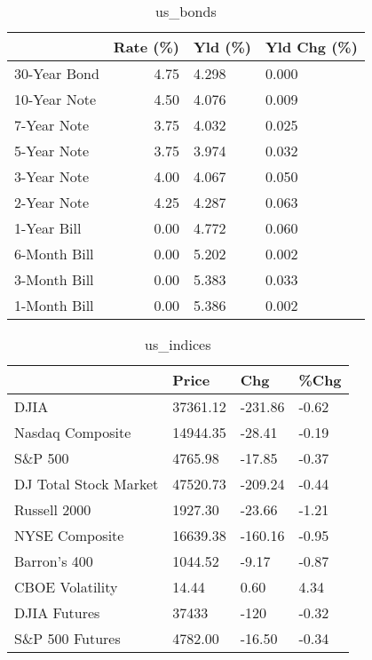 \documentclass{article}%
\begin{document}
%


\begin{table}[htbp]%
\caption{us\_bonds}%
\centering%
\begin{adjustbox}{width=1\textwidth}%
\begin{tabular}{lrll}
\toprule
             &  Rate (\%) & Yld (\%) & Yld Chg (\%) \\
\midrule
30-Year Bond &      4.75 &   4.298 &       0.000 \\
10-Year Note &      4.50 &   4.076 &       0.009 \\
 7-Year Note &      3.75 &   4.032 &       0.025 \\
 5-Year Note &      3.75 &   3.974 &       0.032 \\
 3-Year Note &      4.00 &   4.067 &       0.050 \\
 2-Year Note &      4.25 &   4.287 &       0.063 \\
 1-Year Bill &      0.00 &   4.772 &       0.060 \\
6-Month Bill &      0.00 &   5.202 &       0.002 \\
3-Month Bill &      0.00 &   5.383 &       0.033 \\
1-Month Bill &      0.00 &   5.386 &       0.002 \\
\bottomrule
\end{tabular}
%
\end{adjustbox}%
\end{table}

%


\begin{table}[htbp]%
\caption{us\_indices}%
\centering%
\begin{adjustbox}{width=1\textwidth}%
\begin{tabular}{llll}
\toprule
                      &    Price &     Chg &  \%Chg \\
\midrule
                 DJIA & 37361.12 & -231.86 & -0.62 \\
     Nasdaq Composite & 14944.35 &  -28.41 & -0.19 \\
              S\&P 500 &  4765.98 &  -17.85 & -0.37 \\
DJ Total Stock Market & 47520.73 & -209.24 & -0.44 \\
         Russell 2000 &  1927.30 &  -23.66 & -1.21 \\
       NYSE Composite & 16639.38 & -160.16 & -0.95 \\
         Barron's 400 &  1044.52 &   -9.17 & -0.87 \\
      CBOE Volatility &    14.44 &    0.60 &  4.34 \\
         DJIA Futures &    37433 &    -120 & -0.32 \\
      S\&P 500 Futures &  4782.00 &  -16.50 & -0.34 \\
\bottomrule
\end{tabular}
%
\end{adjustbox}%
\end{table}
\end{document}
